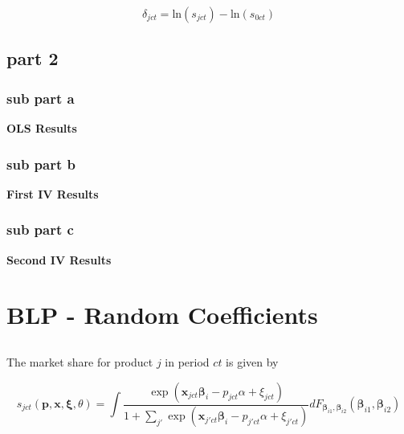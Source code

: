 \documentclass[11pt]{article}
\begin{document}
$$\delta_{jct} = \text{ln}(s_{jct}) - \text{ln}(s_{0ct})$$


\subsection{part 2}
\subsubsection{sub part a}

\begin{center}
	\centering
	\textbf{OLS Results}\par\medskip
	\scalebox{1}{
		
	}
\end{center}


\subsubsection{sub part b}

\begin{center}
	\centering
	\textbf{First IV Results}\par\medskip
	\scalebox{1}{
		
	}
\end{center}


\subsubsection{sub part c}
\begin{center}
	\centering
	\textbf{Second IV Results}\par\medskip
	\scalebox{1}{
		
	}
\end{center}


\section{BLP - Random Coefficients}
\subsection{}
The market share for product $j$ in period $ct$ is given by 

$$ s_{jct}(\bm p, \bm x, \bm \xi, \theta) = 
\int \frac{\exp (\bm x_{jct} \bm \beta_i - p_{jct}\alpha + \xi_{jct})}
{1 + \sum_{j'} \exp(\bm x_{j'ct} \bm \beta_i - p_{j'ct} \alpha + \xi_{j'ct})}
dF_{\bm \beta_{i1}, \bm \beta_{i2}}(\bm \beta_{i1}, \bm \beta_{i2})
$$
\end{document}

